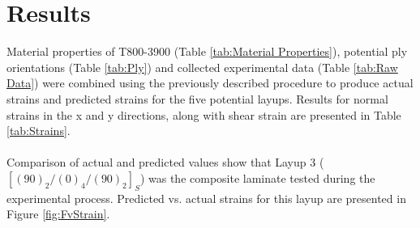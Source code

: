 \documentclass[12pt]{article}
\begin{document}
\section{Results}
Material properties of T800-3900 (Table \ref{tab:Material Properties}), potential ply orientations (Table \ref{tab:Ply}) and collected experimental data (Table \ref{tab:Raw Data}) were combined using the previously described procedure to produce actual strains and predicted strains for the five potential layups. Results for normal strains in the x and y directions, along with shear strain are presented in Table \ref{tab:Strains}.
\\ \\
Comparison of actual and predicted values show that Layup 3 ($[(90)_2/(0)_4/(90)_2]_S$) was the composite laminate tested during the experimental process. Predicted vs. actual strains for this layup are presented in Figure \ref{fig:FvStrain}.
\end{document}
